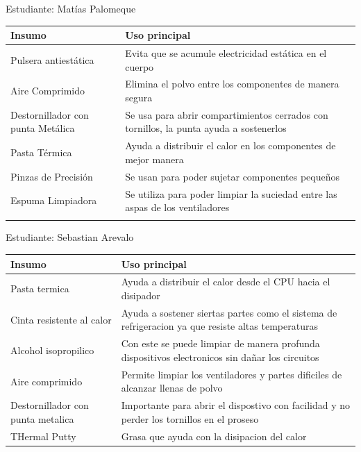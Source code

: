 \documentclass{article}
\begin{document}
Estudiante: Matías Palomeque

\begin{center}
\begin{tabular}{ll}
Insumo & Uso principal\\[0pt]
\hline
Pulsera antiestática & Evita que se acumule electricidad estática en el cuerpo\\[0pt]
Aire Comprimido & Elimina el polvo entre los componentes de manera segura\\[0pt]
Destornillador con punta Metálica & Se usa para abrir compartimientos cerrados con tornillos, la punta ayuda a sostenerlos\\[0pt]
Pasta Térmica & Ayuda a distribuir el calor en los componentes de mejor manera\\[0pt]
Pinzas de Precisión & Se usan para poder sujetar componentes pequeños\\[0pt]
Espuma Limpiadora & Se utiliza para poder limpiar la suciedad entre las aspas de los ventiladores\\[0pt]
 & \\[0pt]
\end{tabular}
\end{center}

Estudiante: Sebastian Arevalo

\begin{center}
\begin{tabular}{ll}
Insumo & Uso principal\\[0pt]
\hline
Pasta termica & Ayuda a distribuir el calor desde el CPU hacia el disipador\\[0pt]
Cinta resistente al calor & Ayuda a sostener siertas partes como el sistema de refrigeracion ya que resiste altas temperaturas\\[0pt]
Alcohol isopropilico & Con este se puede limpiar de manera profunda dispositivos electronicos sin dañar los circuitos\\[0pt]
Aire comprimido & Permite limpiar los ventiladores y partes dificiles de alcanzar llenas de polvo\\[0pt]
Destornillador con punta metalica & Importante para abrir el dispostivo con facilidad y no perder los tornillos en el proseso\\[0pt]
THermal Putty & Grasa que ayuda con la disipacion del calor\\[0pt]
\end{tabular}
\end{center}
\end{document}
